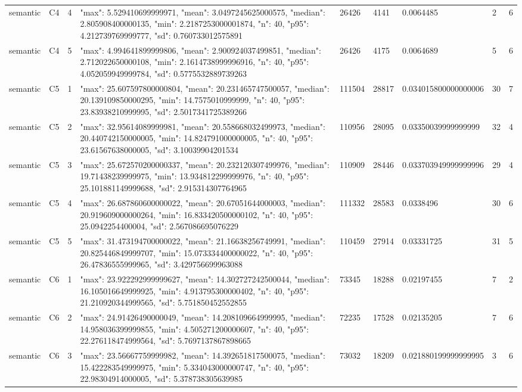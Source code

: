 \begin{tabular}{lllllllll}
semantic & C4 & 4 & {"max": 5.529410699999971, "mean": 3.0497245625000575, "median": 2.805908400000135, "min": 2.2187253000001874, "n": 40, "p95": 4.212739769999777, "sd": 0.760733012575891} & 26426 & 4141 & 0.0064485 & 2 & 6 \\
semantic & C4 & 5 & {"max": 4.994641899999806, "mean": 2.900924037499851, "median": 2.712022650000108, "min": 2.1614738999996916, "n": 40, "p95": 4.052059949999784, "sd": 0.5775532889739263} & 26426 & 4175 & 0.0064689 & 5 & 6 \\
semantic & C5 & 1 & {"max": 25.607597800000804, "mean": 20.231465747500057, "median": 20.139109850000295, "min": 14.7575010999999, "n": 40, "p95": 23.83938210999995, "sd": 2.5017341725389266} & 111504 & 28817 & 0.034015800000000006 & 30 & 7 \\
semantic & C5 & 2 & {"max": 32.95614089999981, "mean": 20.558668032499973, "median": 20.440742150000005, "min": 14.824791000000005, "n": 40, "p95": 23.61567638000005, "sd": 3.10039904201534} & 110956 & 28095 & 0.03350039999999999 & 32 & 4 \\
semantic & C5 & 3 & {"max": 25.672570200000337, "mean": 20.232120307499976, "median": 19.71438239999975, "min": 13.934812299999976, "n": 40, "p95": 25.101881149999688, "sd": 2.915314307764965} & 110909 & 28446 & 0.033703949999999996 & 29 & 4 \\
semantic & C5 & 4 & {"max": 26.687860600000022, "mean": 20.67051644000003, "median": 20.919609000000264, "min": 16.833420500000102, "n": 40, "p95": 25.0942254400004, "sd": 2.567086695076229} & 111332 & 28583 & 0.0338496 & 30 & 6 \\
semantic & C5 & 5 & {"max": 31.473194700000022, "mean": 21.16638256749991, "median": 20.825446849999707, "min": 15.073334400000022, "n": 40, "p95": 26.47836555999965, "sd": 3.429756699963088} & 110459 & 27914 & 0.03331725 & 31 & 5 \\
semantic & C6 & 1 & {"max": 23.922292999999627, "mean": 14.302727242500044, "median": 16.105016649999925, "min": 4.913795300000402, "n": 40, "p95": 21.210920344999565, "sd": 5.751850452552855} & 73345 & 18288 & 0.02197455 & 7 & 2 \\
semantic & C6 & 2 & {"max": 24.91426490000049, "mean": 14.208109664999995, "median": 14.958036399999855, "min": 4.505271200000607, "n": 40, "p95": 22.276118474999564, "sd": 5.7697137867898665} & 72235 & 17528 & 0.02135205 & 7 & 6 \\
semantic & C6 & 3 & {"max": 23.56667759999982, "mean": 14.392651817500075, "median": 15.422283549999975, "min": 5.334043000000747, "n": 40, "p95": 22.98304914000005, "sd": 5.378738305639985} & 73032 & 18209 & 0.021880199999999995 & 3 & 6 \\

\end{tabular}
